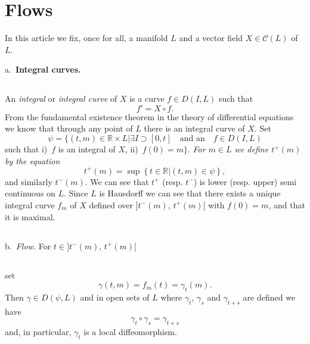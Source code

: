 \section{Flows}\label{chap0:sec6}

In this article we fix, once for all, a manifold $L$ and a vector
field $X\in\mathscr{C}(L)$ of $L$.

\qquad a.~{\bf Integral curves.}

\subsection{}\label{chap0:0.6.1}

\begin{defi*}
An {\em integral} or {\em integral curve} of $X$ is a curve $f\in
D(I,L)$ such that
$$
f'=X\circ f.
$$
From the fundamental existence theorem in the theory of differential
equations we know that through any point of $L$ there is an integral
curve of $X$. Set
\begin{equation*}\label{chap0:0.6.2}
\psi=\{(t,m)\in\mathbb{R}\times L|\exists I\supset
[0,t]\quad\text{and an}\quad f\in D(I,L)\tag{0.6.2}
\end{equation*}
such that i)~$f$ is an integral of $X$, ii)~$f(0)=m\}$. {\em For $m\in
L$ we define $t^{+}(m)$ by the equation}
\begin{equation*}
t^{+}(m)=\sup\left\{t\in\mathbb{R}|(t,m)\in\psi\right\},\tag{0.6.3}
\end{equation*}
and similarly $t^{-}(m)$. We can see that $t^{+}$ (resp. $t^{-}$) is
lower (resp. upper) semi continuous on $L$. Since $L$ is Hausdorff we
can see that there exists a unique integral curve $f_{m}$ of $X$
defined over $]t^{-}(m)$, $t^{+}(m)[$ with $f(0)=m$, and that it is
maximal.
\end{defi*}

\setcounter{subsection}{3}
\subsection{}\label{chap0:0.6.4}
\pageoriginale
b.~{\em Flow.} For $t\in ]t^{-}(m)$, $t^{+}(m)[$

\subsection{}\label{chap0:0.6.5}
set
$$
\gamma(t,m)=f_{m}(t)=\gamma_{t}(m).
$$
Then $\gamma\in D(\psi,L)$ and in open sets of $L$ where $\gamma_{t}$,
$\gamma_{s}$ and $\gamma_{t+s}$ are defined we have
\begin{equation*}
\gamma_{t}\circ \gamma_{s}=\gamma_{t+s}\tag{0.6.6}\label{chap0:0.6.6}
\end{equation*}
and, in particular, $\gamma_{t}$ is a local diffeomorphism.

